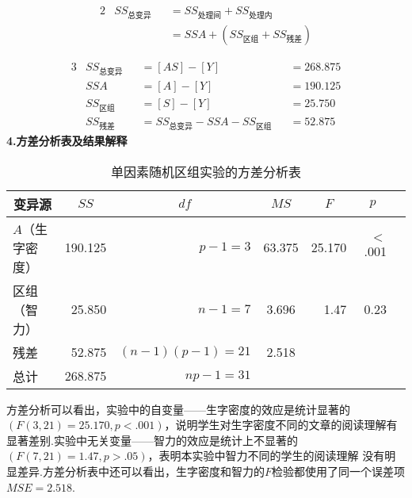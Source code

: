 \begin{definition}[单因素随机区组设计平方和的分解]
\begin{alignat*}{2}
   & SS_{\text{总变异}} &&= SS_{\text{处理间}} + SS_{\text{处理内}}\\
   &                    &&= SSA + (SS_{\text{区组}} + SS_{\text{残差}})
\end{alignat*}
\end{definition}
\begin{alignat*}{3}
    &    SS_{\text{总变异}} &&     =[AS]-[Y]                                 && =268.875\\
    &    SSA                &&    =[A]-[Y]                                  && =190.125\\
    &    SS_{\text{区组}}   &&    =[S]-[Y]                                   && =25.750\\
    &    SS_{\text{残差}}   &&    =SS_{\text{总变异}}-SSA-SS_{\text{区组}}    &&=52.875
\end{alignat*}
\textbf{4.方差分析表及结果解释}
\begin{table}[h]
	\centering
	\caption{单因素随机区组实验的方差分析表}
	{
		\begin{tabular}{lrrcrrr}
			\toprule
			\multicolumn{1}{c}{变异源} & \multicolumn{1}{c}{$SS$} & \multicolumn{1}{c}{$df$} & \multicolumn{1}{c}{$MS$} & \multicolumn{1}{c}{$F$} & \multicolumn{1}{c}{$p$} \\
			\midrule
			$A$（生字密度） & 190.125 & $p-1=3$ & 63.375 & 25.170 & $<$ .001  \\
			区组（智力） & 25.850 & $n-1=7$ & 3.696 & 1.47 & 0.23   \\
			残差 & 52.875 & $(n-1)(p-1)=21$ & 2.518\\
			\midrule
			总计 & 268.875 & $np-1=31$ & & &\\
			\bottomrule
		\end{tabular}
	}
\end{table}

方差分析可以看出，实验中的自变量——生字密度的效应是统计显著的$\left( F(3,21)=25.170, p < .001 \right)$，说明学生对生字密度不同的文章的阅读理解有显著差别.实验中无关变量——智力的效应是统计上不显著的$\left( F \left( 7,21 \right) = 1.47, p > .05 \right)$，表明本实验中智力不同的学生的阅读理解 没有明显差异.方差分析表中还可以看出，生字密度和智力的$F$检验都使用了同一个误差项$MSE=2.518$.

